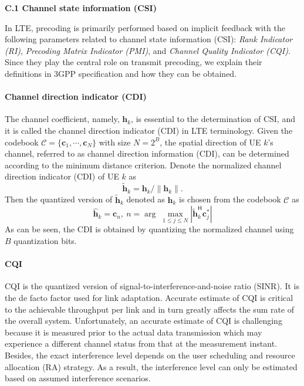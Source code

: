 \documentclass[a4paper,12pt]{article}%
\newcommand{\norm}[1]{\left\lVert#1\right\rVert} %
\begin{document}

\noindent \textbf{C.1 Channel state information (CSI)}

In LTE, precoding is primarily performed based on implicit
feedback with the following parameters related to channel state information (CSI): \emph{Rank Indicator (RI)}, \emph{Precoding Matrix Indicator (PMI)}, and \emph{Channel Quality Indicator (CQI)}. Since they play the central role on transmit precoding, we explain their definitions in 3GPP specification and how they can be obtained.

\paragraph{Channel direction indicator (CDI)}
 The channel coefficient, namely, $\mathbf{h}_k$, is essential to the determination of CSI, and it is called the channel direction indicator (CDI) in LTE terminology. Given the codebook $\mathcal{C}=\{\bm{c}_1,\cdots,\bm{c}_N\}$ with size
$N=2^B$, the spatial direction of UE $k$'s channel, referred to as
channel direction information (CDI), can be determined according to the
minimum distance criterion. Denote the normalized channel direction
indicator (CDI) of UE $k$ as
\begin{equation}\label{eq:cdi}
\tilde{\mathbf{h}}_k=\mathbf{h}_k/\norm{\mathbf{h}_k}.
\end{equation}
Then the quantized version of $\tilde{\mathbf{h}}_k$ denoted as
$\hat{\mathbf{h}}_k$ is chosen from the codebook $\mathcal{C}$ as
\begin{equation}\label{eq:quantized-cdi}
\hat{\mathbf{h}}_k = \bm{c}_n,~n=\arg \; \max_{1 \leq j \leq N} |\tilde{\mathbf{h}}_k^\mathsf{H} \bm{c}_j^*|
\end{equation}
As can be seen, the CDI is obtained by quantizing the normalized channel using $B$ quantization bits.


\paragraph{CQI} 

CQI is the quantized version of signal-to-interference-and-noise ratio (SINR). It is the de facto factor used for link adaptation. Accurate estimate of CQI is critical to the achievable throughput per link and in turn greatly affects the sum rate of the overall system. Unfortunately, an accurate estimate of CQI is challenging because it is measured prior to the actual data transmission which may experience a different channel status from that at the measurement instant. Besides, the exact interference level depends on the user scheduling and resource allocation (RA) strategy. As a result, the interference level can only be estimated based on assumed interference scenarios.
\end{document}
